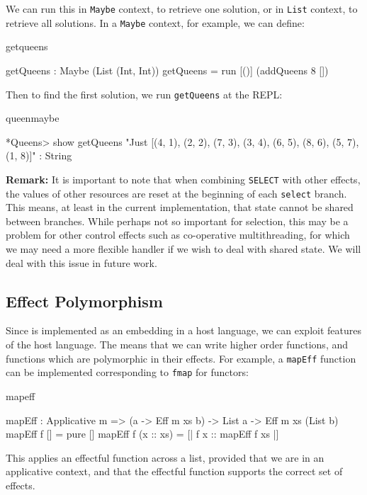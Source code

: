\noindent
We can run this in \texttt{Maybe} context, to retrieve one solution, or in
\texttt{List} context, to retrieve all solutions. In a
\texttt{Maybe} context, for example, we can define:

\begin{SaveVerbatim}{getqueens}

getQueens : Maybe (List (Int, Int))
getQueens = run [()] (addQueens 8 [])

\end{SaveVerbatim}

\noindent
Then to find the first solution, we run \texttt{getQueens} at the %
REPL:

\begin{SaveVerbatim}{queenmaybe}

*Queens> show getQueens
"Just [(4, 1), (2, 2), (7, 3), (3, 4), 
       (6, 5), (8, 6), (5, 7), (1, 8)]" : String

\end{SaveVerbatim}

\noindent
\textbf{Remark:} It is important to note that when combining \texttt{SELECT}
with other effects, the values of other resources are reset at the beginning
of each \texttt{select} branch. This means, at least in the current implementation,
that state cannot be shared between branches. While perhaps not so important
for selection, this may be a problem for other control effects such as 
co-operative multithreading, for which we may need a more flexible handler if
we wish to deal with shared state. We will deal with this issue in future work.

\subsection{Effect Polymorphism}

Since \Eff{} is implemented as an embedding in a host language, we can exploit
features of the host language. The means that we can write higher order
functions, and functions which are polymorphic in their effects. For example,
a \texttt{mapEff} function can be implemented corresponding to \texttt{fmap}
for functors:

\noindent
\begin{SaveVerbatim}{mapeff}

mapEff : Applicative m => 
         (a -> Eff m xs b) -> List a -> Eff m xs (List b)
mapEff f []        = pure [] 
mapEff f (x :: xs) = [| f x :: mapEff f xs |]

\end{SaveVerbatim}

\noindent
This applies an effectful function across a list, provided that we are in
an applicative context, and that the effectful function supports the correct
set of effects.
